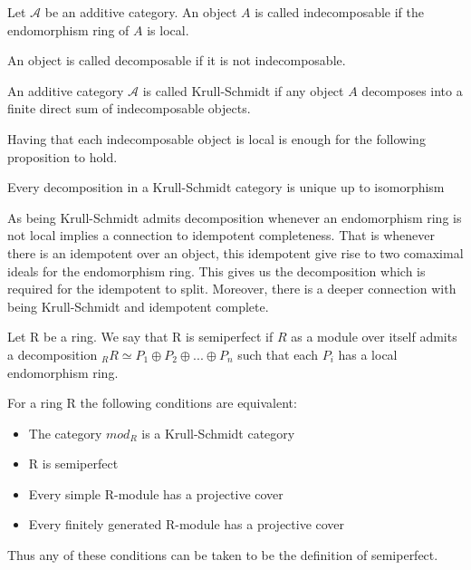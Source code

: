     \begin{definition}
        Let $\mathcal{A}$ be an additive category. An object $A$ is called indecomposable if the endomorphism ring of $A$ is local.

        An object is called decomposable if it is not indecomposable.
    \end{definition}

    \begin{definition}
        An additive category $\mathcal{A}$ is called Krull-Schmidt if any object $A$ decomposes into a finite direct sum of indecomposable objects.
    \end{definition}

    Having that each indecomposable object is local is enough for the following proposition to hold.

    \begin{prop}
        Every decomposition in a Krull-Schmidt category is unique up to isomorphism
    \end{prop}

    As being Krull-Schmidt admits decomposition whenever an endomorphism ring is not local implies a connection to idempotent completeness. That is whenever there is an idempotent over an object, this idempotent give rise to two comaximal ideals for the endomorphism ring. This gives us the decomposition which is required for the idempotent to split. Moreover, there is a deeper connection with being Krull-Schmidt and idempotent complete.

    \begin{definition}
        Let R be a ring. We say that R is semiperfect if $R$ as a module over itself admits a decomposition $_RR\simeq P_1\oplus P_2\oplus ... \oplus P_n$ such that each $P_i$ has a local endomorphism ring.
    \end{definition}

    \begin{remark}
        For a ring R the following conditions are equivalent:
        \begin{itemize}
            \item The category $mod_R$ is a Krull-Schmidt category
            \item R is semiperfect
            \item Every simple R-module has a projective cover
            \item Every finitely generated R-module has a projective cover
        \end{itemize}
        Thus any of these conditions can be taken to be the definition of semiperfect.
    \end{remark}

